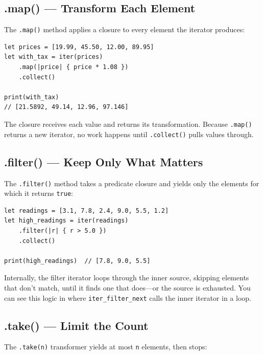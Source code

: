 \subsection{.map() --- Transform Each Element}\label{subsec:iter-map}

The \lstinline|.map()| method applies a closure to every element the iterator produces:

\begin{lstlisting}[language=Lattice, caption={Mapping over an iterator}]
let prices = [19.99, 45.50, 12.00, 89.95]
let with_tax = iter(prices)
    .map(|price| { price * 1.08 })
    .collect()

print(with_tax)
// [21.5892, 49.14, 12.96, 97.146]
\end{lstlisting}

The closure receives each value and returns its transformation.
Because \lstinline|.map()| returns a new iterator, no work happens until \lstinline|.collect()| pulls values through.

\subsection{.filter() --- Keep Only What Matters}\label{subsec:iter-filter}

The \lstinline|.filter()| method takes a predicate closure and yields only the elements for which it returns \lstinline|true|:

\begin{lstlisting}[language=Lattice, caption={Filtering an iterator}]
let readings = [3.1, 7.8, 2.4, 9.0, 5.5, 1.2]
let high_readings = iter(readings)
    .filter(|r| { r > 5.0 })
    .collect()

print(high_readings)  // [7.8, 9.0, 5.5]
\end{lstlisting}

Internally, the filter iterator loops through the inner source, skipping elements that don't match, until it finds one that does---or the source is exhausted.
You can see this logic in  where \lstinline|iter_filter_next| calls the inner iterator in a loop.

\subsection{.take() --- Limit the Count}\label{subsec:iter-take}

The \lstinline|.take(n)| transformer yields at most \lstinline|n| elements, then stops:

